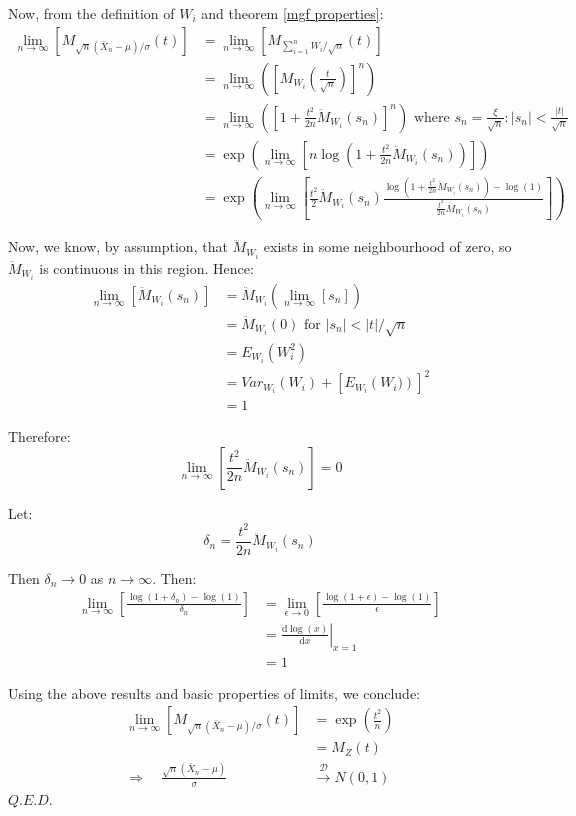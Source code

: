 \documentclass[12pt,a4paper]{article}
\newcommand{\diff}{\mathrm{d}}
\begin{document}
Now, from the definition of $W_i$ and theorem \ref{mgf properties}:
\begin{align*}
\lim_{n\to\infty}\left[M_{\sqrt{n}\left(\bar{X}_n-\mu\right)/\sigma}(t)\right] &= \lim_{n\to\infty}\left[M_{\sum\limits_{i=1}^n W_i/\sqrt{n}}(t)\right]\\
&= \lim_{n\to\infty}\left(\left[M_{W_i}\left(\frac{t}{\sqrt{n}}\right)\right]^n\right)\\
&= \lim_{n\to\infty}\left(\left[1+\frac{t^2}{2n}\ddot{M}_{W_i}(s_n)\right]^n\right) \mbox{ where $s_n = \frac{\xi}{\sqrt{n}}: |s_n| < \frac{|t|}{\sqrt{n}}$}\\
&= \exp\left(\lim_{n\to\infty}\left[n\log\left(1 + \frac{t^2}{2n}\ddot{M}_{W_i}(s_n)\right)\right]\right)\\
&= \exp\left(\lim_{n\to\infty}\left[\frac{t^2}{2}\ddot{M}_{W_i}(s_n)\frac{\log\left(1+\frac{t^2}{2n}\ddot{M}_{W_i}(s_n)\right) - \log(1)}{\frac{t^2}{2n}\ddot{M}_{W_i}(s_n)}\right]\right)
\end{align*}

Now, we know, by assumption, that $\dddot{M}_{W_i}$ exists in some neighbourhood of zero, so $\ddot{M}_{W_i}$ is continuous in this region. Hence:
\begin{align*}
\lim_{n\to\infty}\left[\ddot{M}_{W_i}(s_n)\right] &= \ddot{M}_{W_i}\left(\lim_{n\to\infty}[s_n]\right)\\
&= \ddot{M}_{W_i}(0) \mbox{ for $|s_n| < |t|/\sqrt{n}$}\\
&= E_{W_i}\left(W_i^2\right)\\
&= Var_{W_i}\left(W_i\right) + \left[E_{W_i}\left(W_i)\right)\right]^2\\
&= 1
\end{align*}

Therefore:
$$\lim_{n\to\infty}\left[\frac{t^2}{2n}\ddot{M}_{W_i}(s_n)\right] = 0$$

Let:
$$\delta_n = \frac{t^2}{2n}\ddot{M}_{W_i}(s_n)$$

Then $\delta_n \to 0$ as $n\to\infty$. Then:
\begin{align*}
\lim_{n\to\infty}\left[\frac{\log\left(1+\delta_n\right) - \log(1)}{\delta_n}\right] &= \lim_{\epsilon\to 0}\left[\frac{\log\left(1+\epsilon\right)-\log(1)}{\epsilon}\right]\\
&= \left.\frac{\diff \log(x)}{\diff x}\right|_{x=1}\\
&= 1
\end{align*}

Using the above results and basic properties of limits, we conclude:
\begin{align*}
\lim_{n\to\infty}\left[M_{\sqrt{n}\left(\bar{X}_n-\mu\right)/\sigma}(t)\right] &= \exp\left(\frac{t^2}{n}\right)\\
&= M_Z(t)\\
\Rightarrow\quad \frac{\sqrt{n}\left(\bar{X}_n-\mu\right)}{\sigma} &\xrightarrow{\mathscr{D}} N(0,1)
\end{align*}\hfill$Q.E.D.$
\end{document}
